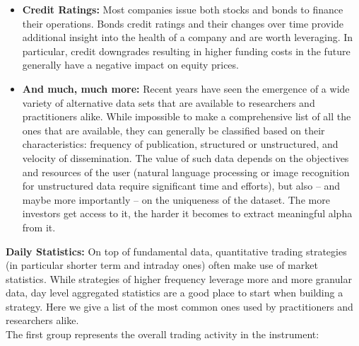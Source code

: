\begin{itemize}
\item \textbf{Credit Ratings:} Most companies issue both stocks and bonds to finance their operations. Bonds credit ratings and their changes over time provide additional insight into the health of a company and are worth leveraging. In particular, credit downgrades resulting in higher funding costs in the future generally have a negative impact on equity prices.

\item \textbf{And much, much more:} Recent years have seen the emergence of a wide variety of alternative data sets that are available to researchers and practitioners alike.  While impossible to make a comprehensive list of all the ones that are available, they can generally be classified based on their characteristics: frequency of publication, structured or unstructured, and velocity of dissemination. The value of such data depends on the objectives and resources of the user (natural language processing or image recognition for unstructured data require significant time and efforts), but also -- and maybe more importantly -- on the uniqueness of the dataset. The more investors get access to it, the harder it becomes to extract meaningful alpha from it.
\end{itemize}


\noindent\textbf{Daily Statistics:} On top of fundamental data, quantitative trading strategies (in particular shorter term and intraday ones) often make use of market statistics. While strategies of higher frequency leverage more and more granular data, day level aggregated statistics are a good place to start when building a strategy. Here we give a list of the most common ones used by practitioners and researchers alike. \\

The first group represents the overall trading activity in the instrument: 

